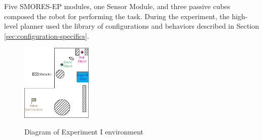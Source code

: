 \documentclass[journal]{IEEEtran}
\begin{document}
Five SMORES-EP modules, one Sensor Module, and three passive cubes composed the robot for performing the task. 
During the experiment, the high-level planner used the library of configurations and behaviors described in Section \ref{sec:configuration-specifics}.

\begin{figure}
\begin{center}
\includegraphics[width=0.3\textwidth]{images/RSSMap.png}
\caption{Diagram of Experiment I environment}
\vspace{-2em}
\label{fig:map}
\end{center}
\end{figure}
\end{document}
